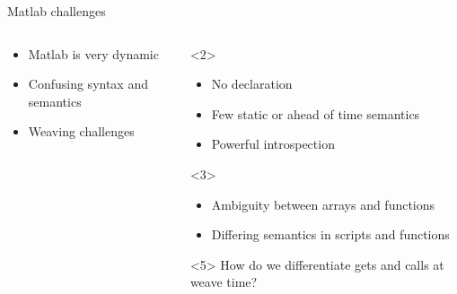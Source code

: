 \begin{frame}{Matlab challenges}
  \begin{columns}
    \begin{column}{5cm}
      \begin{itemize}
      \item<alert@2> Matlab is very dynamic
      \item<alert@3> Confusing syntax and semantics
      \item<alert@4-> Weaving challenges
      \end{itemize}
    \end{column}
    \begin{column}{5cm}
      \begin{onlyenv}<2>
          \begin{itemize}
          \item No declaration 
          \item Few static or ahead of time semantics
          \item Powerful introspection
          \end{itemize}
      \end{onlyenv}
      \begin{onlyenv}<3>
          \begin{itemize}
          \item Ambiguity between arrays and functions
          \item Differing semantics in scripts and functions 
          \end{itemize}
      \end{onlyenv}
      \begin{onlyenv}<5>
          How do we differentiate gets and calls at weave time?
      \end{onlyenv}
    \end{column}
  \end{columns}
\end{frame}

